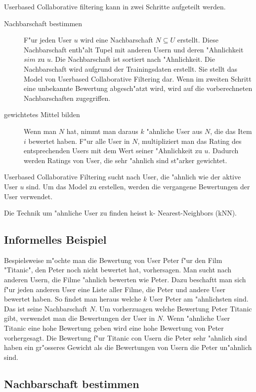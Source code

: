 \documentclass[a4paper, 12pt]{article}
\begin{document}
Userbased Collaborative filtering kann in zwei Schritte aufgeteilt werden. 

\begin{description}
\item[Nachbarschaft bestimmen] F"ur jeden User $u$ wird eine Nachbarschaft $N \subseteq U$ erstellt. Diese Nachbarschaft enth"alt Tupel mit anderen Usern und deren "Ahnlichkeit $sim$ zu $u$. Die Nachbarschaft ist sortiert nach "Ahnlichkeit. Die Nachbarschaft wird aufgrund der Trainingsdaten erstellt. Sie stellt das Model von Userbased Collaborative Filtering dar. Wenn im zweiten Schritt eine unbekannte Bewertung abgesch"atzt wird, wird auf die vorberechneten Nachbarschaften zugegriffen.
\item [gewichtetes Mittel bilden] Wenn man $N$ hat, nimmt man daraus $k$ "ahnliche User aus $N$, die das Item $i$ bewertet haben. F"ur alle User in $N$, multipliziert man das Rating des entsprechenden Users mit dem Wert seiner "Ahnlichkeit zu $u$. Dadurch werden Ratings von User, die sehr "ahnlich sind st"arker gewichtet. 
\end{description}

Userbased Collaborative Filtering sucht nach User, die "ahnlich wie der aktive User $u$ sind. Um das Model zu erstellen, werden die vergangene Bewertungen der User verwendet.

Die Technik um "ahnliche User zu finden heisst k- Nearest-Neighbors (kNN). 

\subsection{Informelles Beispiel}
\label{sec:example}

Bespielsweise m"ochte man die Bewertung von User Peter f"ur den Film "Titanic", den Peter noch nicht bewertet hat, vorhersagen. Man sucht nach anderen Usern, die Filme "ahnlich bewerten wie Peter. Dazu beschaftt man sich f"ur jeden anderen User eine Liste aller Filme, die Peter und andere User bewertet haben. So findet man heraus welche $k$ User Peter am "ahnlichsten sind. Das ist seine Nachbarschaft $N$. Um vorherzuagen welche Bewertung Peter Titanic gibt, verwendet man die Bewertungen der User in $N$. Wenn "ahnliche User Titanic eine hohe Bewertung geben wird eine hohe Bewertung von Peter vorhergesagt. Die Bewertung f"ur Titanic con Usern die Peter sehr "ahnlich sind haben ein gr"osseres Gewicht als die Bewertungen von Usern die Peter un"ahnlich sind.


\subsection{Nachbarschaft bestimmen}
\label{sec:neigborhood}
\end{document}
